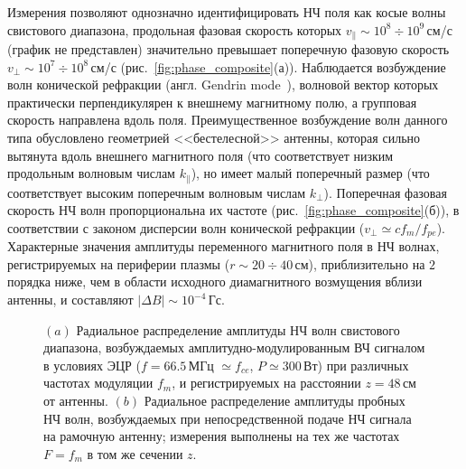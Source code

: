 \documentclass[10pt]{disser}
\begin{document}
%  

Измерения позволяют однозначно идентифицировать НЧ поля как косые волны свистового диапазона, продольная фазовая скорость которых $v_{\parallel}\sim 10^8 \div 10^9$\,см/с (график не представлен) значительно превышает поперечную фазовую скорость $v_{\perp}\sim 10^7 \div 10^8$\,см/с (\mbox{рис.~\ref{fig:phase_composite}(а)}). Наблюдается возбуждение волн конической рефракции (англ. Gendrin mode~\cite{Helliwell}), волновой вектор которых практически перпендикулярен к внешнему магнитному полю, а групповая скорость направлена вдоль поля. Преимущественное возбуждение волн данного типа обусловлено геометрией <<бестелесной>> антенны, которая сильно вытянута вдоль внешнего магнитного поля (что соответствует низким продольным волновым числам $k_{\parallel}$), но имеет малый поперечный размер (что соответствует высоким поперечным волновым числам $k_{\perp}$). Поперечная фазовая скорость НЧ волн пропорциональна их частоте (\mbox{рис.~\ref{fig:phase_composite}(б))}, в соответствии с законом дисперсии волн конической рефракции ($v_{\perp}\simeq c f_m/f_{pe}$). Характерные значения амплитуды переменного магнитного поля в НЧ волнах, регистрируемых на периферии плазмы ($r\sim 20\div 40$\,см), приблизительно на $2$ порядка ниже, чем в области исходного диамагнитного возмущения вблизи антенны, и составляют $|\Delta B|\sim 10^{-4}$\,Гс.

\begin{figure}[H]
  \centering
  \def\svgwidth{0.6\columnwidth} %
  
  \vspace{0.7cm}
  \caption{$(a)$ Радиальное распределение амплитуды НЧ волн свистового диапазона, возбуждаемых амплитудно-модулированным ВЧ сигналом в условиях ЭЦР ($f=66.5$\,МГц $\simeq f_{ce}$, $P\simeq 300$\,Вт) при различных частотах модуляции $f_{m}$, и регистрируемых на расстоянии $z=48$\,см от антенны. $(b)$ Радиальное распределение амплитуды пробных НЧ волн, возбуждаемых при непосредственной подаче НЧ сигнала на рамочную антенну; измерения выполнены на тех же частотах $F=f_m$ в том же сечении $z$.}
  \label{fig:param_vs_dir}
\end{figure} 
 
\end{document}
